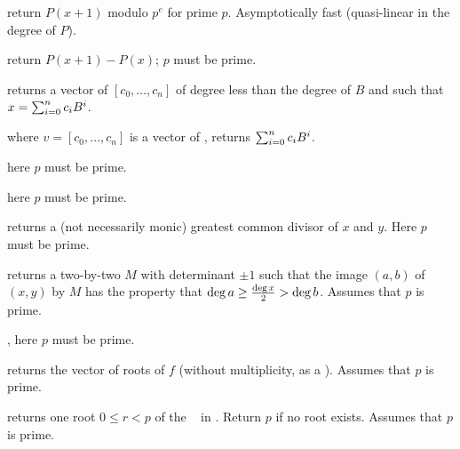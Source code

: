 return $P(x+1)$
modulo $p^e$ for prime $p$. Asymptotically fast (quasi-linear in the degree of
$P$).

 return $P(x+1)-P(x)$; $p$ must be prime.

 returns a vector of 
$[c_0,\ldots,c_n]$ of degree less than the degree of $B$ and such that
$x=\sum_{i=0}^{n}{c_i\*B^i}$.

 where $v=[c_0,\ldots,c_n]$
is a vector of , returns $\sum_{i=0}^{n}{c_i\*B^i}$.

here $p$ must be prime.


here $p$ must be prime.


 returns a (not necessarily monic)
greatest common divisor of $x$  and $y$. Here $p$ must be prime.


 returns a two-by-two 
$M$ with determinant $\pm 1$ such that the image $(a,b)$ of $(x,y)$ by $M$
has the property that $\deg a \geq {\deg x \over 2} > \deg b$.
Assumes that $p$ is prime.




,
here $p$ must be prime.


 returns the vector of roots
of $f$ (without multiplicity, as a ). Assumes that $p$ is
prime.


 returns one root $0 \leq r < p$ of
the ~ in . Return $p$ if no root exists.
Assumes that $p$ is prime.

